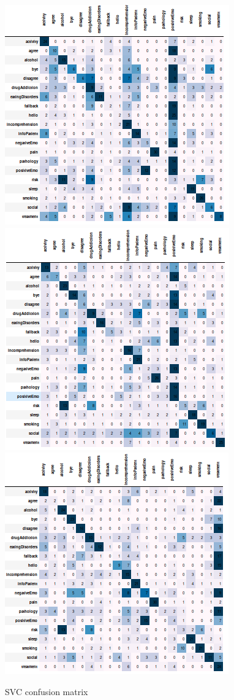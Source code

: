 \documentclass[11pt]{article}
\begin{document}
{\begin{figure}[h]
	\centering
	\includegraphics[scale=0.3]{lsvc_0.png}
	\includegraphics[scale=0.3]{lsvc_1.png}
	\includegraphics[scale=0.3]{lsvc_2.png}
	\caption{SVC confusion matrix}
\label{lda_gm_cm}
\end{figure}
\FloatBarrier


}
\end{document}
